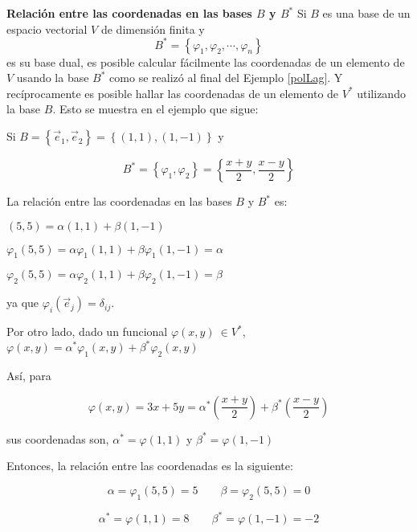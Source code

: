 \bigskip


\textbf{Relación entre las coordenadas en las bases $B$ y $B^*$}
Si $B$ es una base de un espacio vectorial $V$ de dimensión finita y 
$$B^*= \left\{\varphi_1,\varphi_2,\cdots,\varphi_n\right\}$$  es su base dual, es posible calcular fácilmente las coordenadas de un elemento de $V$ usando la base $B^*$ como se realizó al final del  Ejemplo \ref{polLag}. Y recíprocamente es posible hallar las coordenadas  de un elemento de $V^*$ utilizando la base $B$. Esto se muestra en el ejemplo que sigue:

\bigskip

\begin{example}
Si 
$B= \left\{\vec{e}_1,\vec{e}_2\right\}=  \left\{(1,1),(1,-1)\right\}    $ y 


\[B^*= \left\{\varphi_1,\varphi_2\right\}=\left\{\frac{x+y}{2},\frac{x-y}{2}\right\} \]

La relación entre las coordenadas en las bases $B$ y $B^*$ es:

\bigskip

$(5,5)= \alpha (1,1) + \beta  (1,-1)$


\bigskip


$\varphi_1(5,5)= \alpha \varphi_1(1,1) + \beta \varphi_1 (1,-1)=  \alpha$

\bigskip

$\varphi_2(5,5)= \alpha \varphi_2(1,1) + \beta \varphi_2 (1,-1)=  \beta$

\bigskip

ya que $ \varphi_i(\vec{e}_j)= \delta_{ij} $.

\bigskip

Por otro lado, dado un funcional $\varphi(x,y) ~\in V^*$, $\varphi(x,y) = \alpha^* \varphi_1 (x,y) + \beta^*  \varphi_2(x,y)  $

Así, para 

\bigskip
\noindent
\[\varphi(x,y) = 3 x + 5 y = \alpha^* (\frac{x+y}{2}) +\beta^*  (\frac{x-y}{2}) \]



\bigskip

\noindent
sus coordenadas son,  $  \alpha^* =\varphi(1,1)$ y $  \beta^*= \varphi(1,-1) $ 

\bigskip

 Entonces, la relación entre las coordenadas es la siguiente:
 
\bigskip
 
$$\alpha=\varphi_1(5,5)=5 \qquad\beta=\varphi_2(5,5)=0$$


$$\alpha^*= \varphi (1,1)=8  \qquad\beta^* = \varphi(1,-1) =-2$$

\bigskip



\end{example}
\bigskip


